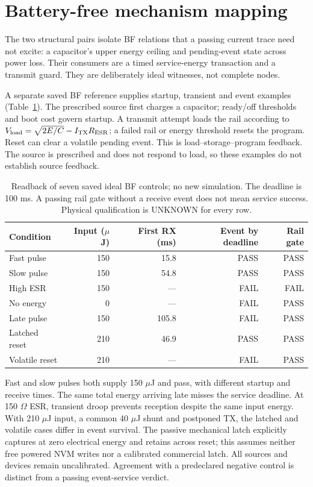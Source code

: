 \section{Battery-free mechanism mapping}
The two structural pairs isolate BF relations that a passing current trace need
not excite: a capacitor's upper energy ceiling and pending-event state across
power loss. Their consumers are a timed service-energy transaction and a
transmit guard. They are deliberately ideal witnesses, not complete nodes.

A separate saved BF reference supplies startup, transient and event examples
(Table~\ref{tab:bf-reference}). The prescribed source first charges a capacitor;
ready/off thresholds and boot cost govern startup. A transmit attempt loads the
rail according to $V_{\rm load}=\sqrt{2E/C}-I_{\rm TX}R_{\rm ESR}$; a failed rail
or energy threshold resets the program. Reset can clear a volatile pending
event. This is load--storage--program feedback. The source is prescribed and
does not respond to load, so these examples do not establish source feedback.

\begin{table}[ht]
\centering\small
\begin{tabular}{lrrrr}
\toprule
Condition & Input ($\mu$J) & First RX (ms) & Event by deadline & Rail gate \\
\midrule
Fast pulse & 150 & 15.8 & PASS & PASS \\
Slow pulse & 150 & 54.8 & PASS & PASS \\
High ESR & 150 & --- & FAIL & FAIL \\
No energy & 0 & --- & FAIL & PASS \\
Late pulse & 150 & 105.8 & FAIL & PASS \\
Latched reset & 210 & 46.9 & PASS & PASS \\
Volatile reset & 210 & --- & FAIL & PASS \\
\bottomrule
\end{tabular}
\caption{Readback of seven saved ideal BF controls; no new simulation. The
deadline is 100 ms. A passing rail gate without a receive event does not mean
service success. Physical qualification is UNKNOWN for every row.}
\label{tab:bf-reference}
\end{table}

Fast and slow pulses both supply 150 $\mu$J and pass, with different startup and
receive times. The same total energy arriving late misses the service deadline.
At 150 $\Omega$ ESR, transient droop prevents reception despite the same input
energy. With 210 $\mu$J input, a common 40 $\mu$J shunt and postponed TX, the
latched and volatile cases differ in event survival. The passive mechanical
latch explicitly captures at zero electrical energy and retains across reset;
this assumes neither free powered NVM writes nor a calibrated commercial latch.
All sources and devices remain uncalibrated. Agreement with a predeclared
negative control is distinct from a passing event-service verdict.
